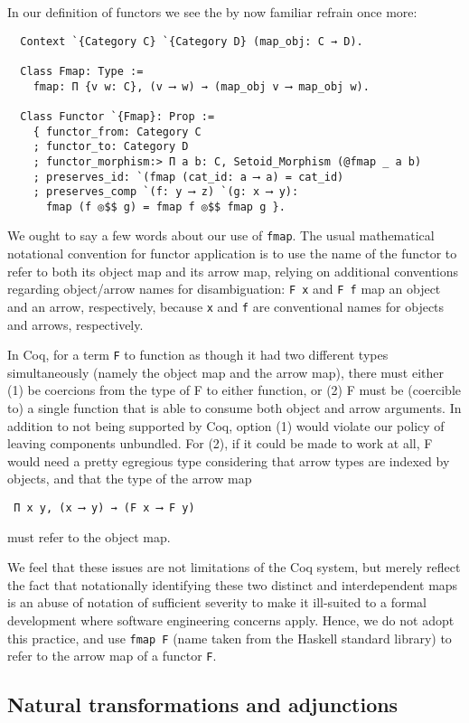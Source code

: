 \documentclass[a4paper,10pt,runningheads]{llncs}
\begin{document}
In our definition of functors we see the by now familiar refrain once more:
\begin{lstlisting}
  Context `{Category C} `{Category D} (map_obj: C → D).

  Class Fmap: Type :=
    fmap: Π {v w: C}, (v ⟶ w) → (map_obj v ⟶ map_obj w).

  Class Functor `{Fmap}: Prop :=
    { functor_from: Category C
    ; functor_to: Category D
    ; functor_morphism:> Π a b: C, Setoid_Morphism (@fmap _ a b)
    ; preserves_id: `(fmap (cat_id: a ⟶ a) = cat_id)
    ; preserves_comp `(f: y ⟶ z) `(g: x ⟶ y):
      fmap (f ◎$$ g) = fmap f ◎$$ fmap g }.
\end{lstlisting}
We ought to say a few words about our use of \lstinline|fmap|. The usual mathematical notational convention for functor application is to use the name of the functor to refer to both its object map and its arrow map, relying on additional conventions regarding object/arrow names for disambiguation: \lstinline|F x| and \lstinline|F f| map an object and an arrow, respectively, because \lstinline|x| and \lstinline|f| are conventional names for objects and arrows, respectively.

In Coq, for a term \lstinline|F| to function as though it had two different types simultaneously (namely the object map and the arrow map), there must either (1) be coercions from the type of F to either function, or (2) F must be (coercible to) a single function that is able to consume both object and arrow arguments. In addition to not being supported by Coq, option (1) would violate our policy of leaving components unbundled. For (2), if it could be made to work at all, F would need a pretty egregious type considering that arrow types are indexed by objects, and that the type of the arrow map
\begin{lstlisting}
 Π x y, (x ⟶ y) → (F x ⟶ F y)
\end{lstlisting}
must refer to the object map.

We feel that these issues are not limitations of the Coq system, but merely reflect the fact that notationally identifying these two distinct and interdependent maps is an abuse of notation of sufficient severity to make it ill-suited to a formal development where software engineering concerns apply. Hence, we do not adopt this practice, and use \lstinline|fmap F| (name taken from the Haskell standard library) to refer to the arrow map of a functor \lstinline|F|.

\subsection{Natural transformations and adjunctions}
\end{document}
